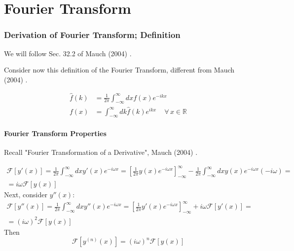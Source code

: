 \part{Fourier Transform}


\section{Derivation of Fourier Transform; Definition}

We will follow Sec. 32.2 of Mauch (2004) \cite{agat:Mauc2004}.

Consider now this definition of the Fourier Transform, different from Mauch (2004) \cite{agat:Mauc2004}.

\begin{definition}
\begin{equation}
\begin{aligned}
\widehat{f}(k) &= \frac{1}{2\pi} \int_{-\infty}^{\infty} dx f(x) e^{-ikx} \\
f(x) & = \int_{-\infty}^{\infty} dk \widehat{f}(k) e^{ikx} \quad \, \forall \, x \in \mathbb{R}
\end{aligned}
\end{equation}
\end{definition}

\subsection{Fourier Transform Properties}

Recall "Fourier Transformation of a Derivative", Mauch (2004) \cite{agat:Mauc2004}.

\[
\begin{gathered}
\mathcal{F}[y'(x)] = \frac{1}{2\pi} \int_{-\infty}^{\infty} dx y'(x) e^{-i\omega x } = \left[ \frac{1}{2\pi} y(x) e^{-i\omega x} \right]_{-\infty}^{\infty} - \frac{1}{2\pi} \int_{-\infty}^{\infty} dx y(x) e^{-i\omega x} (-i \omega) = \\
= i\omega \mathcal{F}[y(x)]
\end{gathered}
\]
Next, consider $y''(x)$:
\[
\begin{gathered}
\mathcal{F}[y''(x)] = \frac{1}{2\pi} \int_{-\infty}^{\infty} dx y''(x) e^{-i\omega x } = \left[ \frac{1}{2\pi} y'(x) e^{-i\omega x} \right]_{-\infty}^{\infty} + i \omega \mathcal{F}[y'(x)] = \\
= (i\omega)^2 \mathcal{F}[y(x)]
\end{gathered}
\]
Then 
\begin{equation}
\mathcal{F}[y^{(n)}(x) ] = (i\omega)^n \mathcal{F}[y(x)]
\end{equation}

